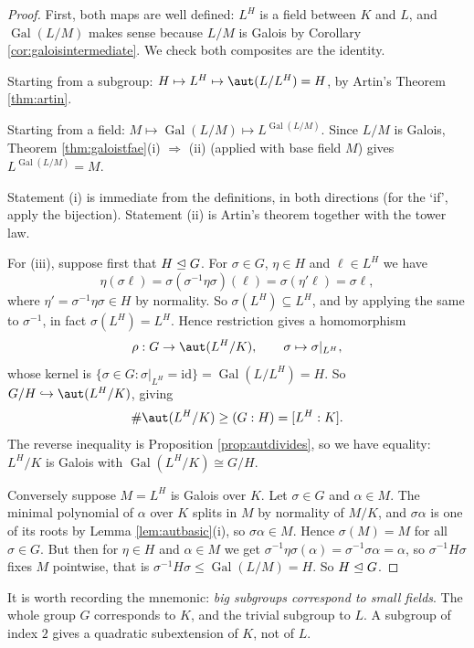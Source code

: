 \documentclass[a4paper]{scrartcl}
\newcommand{\Gal}{\operatorname{Gal}}
\begin{document}
\begin{proof}
	First, both maps are well defined: $L^H$ is a field between $K$ and $L$, and $\Gal(L/M)$ makes sense because $L/M$ is Galois by Corollary \ref{cor:galoisintermediate}. We check both composites are the identity.

	Starting from a subgroup: $H \mapsto L^H \mapsto \aut(L/L^H) = H$, by Artin's Theorem \ref{thm:artin}.

	Starting from a field: $M \mapsto \Gal(L/M) \mapsto L^{\Gal(L/M)}$. Since $L/M$ is Galois, Theorem \ref{thm:galoistfae}(i) $\Rightarrow$ (ii) (applied with base field $M$) gives $L^{\Gal(L/M)} = M$.

	Statement (i) is immediate from the definitions, in both directions (for the `if', apply the bijection). Statement (ii) is Artin's theorem together with the tower law.

	For (iii), suppose first that $H \trianglelefteq G$. For $\sigma \in G$, $\eta \in H$ and $\ell \in L^H$ we have
	$$\eta(\sigma \ell) = \sigma(\sigma^{-1}\eta\sigma)(\ell) = \sigma(\eta'\ell) = \sigma\ell,$$
	where $\eta' = \sigma^{-1}\eta\sigma \in H$ by normality. So $\sigma(L^H) \subseteq L^H$, and by applying the same to $\sigma^{-1}$, in fact $\sigma(L^H) = L^H$. Hence restriction gives a homomorphism
	$$\rho : G \to \aut(L^H/K), \qquad \sigma \mapsto \sigma|_{L^H},$$
	whose kernel is $\{\sigma \in G : \sigma|_{L^H} = \mathrm{id}\} = \Gal(L/L^H) = H$. So $G/H \hookrightarrow \aut(L^H/K)$, giving
	$$\#\aut(L^H/K) \geq (G:H) = [L^H:K].$$
	The reverse inequality is Proposition \ref{prop:autdivides}, so we have equality: $L^H/K$ is Galois with $\Gal(L^H/K) \cong G/H$.

	Conversely suppose $M = L^H$ is Galois over $K$. Let $\sigma \in G$ and $\alpha \in M$. The minimal polynomial of $\alpha$ over $K$ splits in $M$ by normality of $M/K$, and $\sigma\alpha$ is one of its roots by Lemma \ref{lem:autbasic}(i), so $\sigma\alpha \in M$. Hence $\sigma(M) = M$ for all $\sigma \in G$. But then for $\eta \in H$ and $\alpha \in M$ we get $\sigma^{-1}\eta\sigma(\alpha) = \sigma^{-1}\sigma\alpha = \alpha$, so $\sigma^{-1}H\sigma$ fixes $M$ pointwise, that is $\sigma^{-1}H\sigma \leq \Gal(L/M) = H$. So $H \trianglelefteq G$.
\end{proof}

\begin{remark}
	It is worth recording the mnemonic: \emph{big subgroups correspond to small fields}. The whole group $G$ corresponds to $K$, and the trivial subgroup to $L$. A subgroup of index $2$ gives a quadratic subextension of $K$, not of $L$.
\end{remark}
\end{document}
